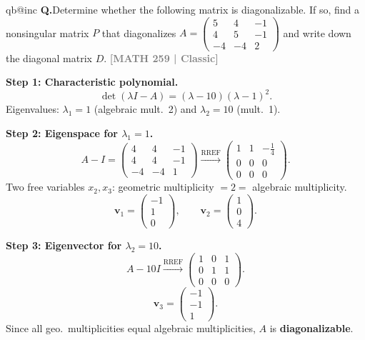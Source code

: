 \documentclass[12pt,a3paper]{article}
\makeatletter
\newcommand{\yr}[1]{\hfill\textcolor{gray}{\small\textbf{[#1]}}}
\newcounter{qnum}
\newcommand{\Q}[1]{%
  \csname qb@inc\endcsname
  \needspace{4\baselineskip}
  \refstepcounter{qnum}
  \vspace{6pt}
  \noindent\textbf{Q\theqnum.}\enspace #1\par
}
\makeatother
\begin{document}
\Q{Determine whether the following matrix is diagonalizable. If so, find a nonsingular matrix $P$ that diagonalizes $A = \begin{pmatrix} 5 & 4 & -1 \\ 4 & 5 & -1 \\ -4 & -4 & 2 \end{pmatrix}$ and write down the diagonal matrix $D$.
\yr{MATH 259 | Classic}}


\begin{tcolorbox}[enhanced,breakable,
  colback=cE!4,colframe=cE,boxrule=0.8pt,arc=5pt,
  title={\textbf{Answer --- Diagonalizability of
    $A=\begin{pmatrix}5&4&-1\\4&5&-1\\-4&-4&2\end{pmatrix}$}},
  fonttitle=\bfseries\color{white},colbacktitle=cE]

\textbf{Step 1: Characteristic polynomial.}
\[
  \det(\lambda I-A) = (\lambda-10)(\lambda-1)^2.
\]
Eigenvalues: $\lambda_1=1$ (algebraic mult.\ 2) and $\lambda_2=10$ (mult.\ 1).

\textbf{Step 2: Eigenspace for $\lambda_1=1$.}
\[
  A-I=\begin{pmatrix}4&4&-1\\4&4&-1\\-4&-4&1\end{pmatrix}
  \xrightarrow{\text{RREF}}
  \begin{pmatrix}1&1&-\frac{1}{4}\\0&0&0\\0&0&0\end{pmatrix}.
\]
Two free variables $x_2,x_3$: geometric multiplicity $=2=$ algebraic multiplicity.
\[
  \mathbf{v}_1=\begin{pmatrix}-1\\1\\0\end{pmatrix},\qquad
  \mathbf{v}_2=\begin{pmatrix}1\\0\\4\end{pmatrix}.
\]

\textbf{Step 3: Eigenvector for $\lambda_2=10$.}
\[
  A-10I\xrightarrow{\text{RREF}}
  \begin{pmatrix}1&0&1\\0&1&1\\0&0&0\end{pmatrix}.
\]
\[
  \mathbf{v}_3=\begin{pmatrix}-1\\-1\\1\end{pmatrix}.
\]
Since all geo.\ multiplicities equal algebraic multiplicities, $A$ is
\textbf{diagonalizable}.


\end{tcolorbox}
\end{document}
